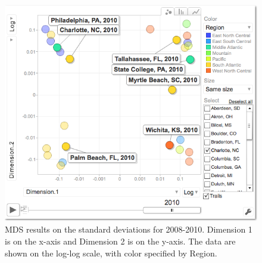 \documentclass[11pt]{asaproc}
\begin{document}
\begin{figure}[H]
\begin{framed}
\hspace{0.5cm}
\begin{minipage}[b]{0.45\linewidth}
\centering
\includegraphics[width=\textwidth]{mdssd10.png}
\end{minipage}
\hspace{0.5cm}
\begin{minipage}[b]{0.45\linewidth}
\centering
\caption{MDS results on the standard deviations for
  2008-2010. Dimension 1 is on the x-axis and Dimension 2 is on the
  y-axis. The data are shown on the log-log scale, with color
  specified by Region.}
\label{fig:mdsMCsd}
\end{minipage}
\end{framed}
\end{figure}
\end{document}
